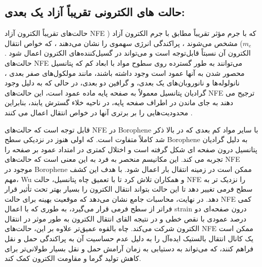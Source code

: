 \subsection{حالت های الکترونی تقریباً آزاد یک بعدی:}
حالت‌های تقریباً الکترون آزاد \gls{NFE} که با جرم مؤثر تقریباً مطابق با جرم الکترون آزاد ($m_e$) مشخص می‌شوند \cite{eknapakulNearlyfreeelectronSystemMonolayer2016, fengElectronicPropertiesSuperatom2011}، پراکندگی انرژی سهموی را نشان می‌دهند ، که خواص انتقال الکترون آن نسبتاً قابل‌توجه است و می‌تواند در گسیل‌کننده‌های الکترون اعمال شود \cite{chenNonlocalChemicalReactivity2009, csanyiRoleInterlayerState2005}. حالت‌های \gls{NFE} می‌توانند به طور گسترده روی سطوح مواد با ابعاد کم که پتانسیل محصور شدن به آنها عمود است وجود داشته باشند، مانند مولکول‌های صفر بعدی ، \cite{zhaoSuperatomStatesFullerenes2009, fengAtomlikeHollowcoreboundMolecular2008} نانولوله‌ها و نانوروبان‌های یک بعدی، \cite{yamanakaElectronInjectionNearly2014, huNearlyFreeElectron2010} و گرافین دو بعدی، \cite{silkinImagePotentialStates2009} در حالی که به دلیل وجود گرادیان پتانسیل معمولاً به صفحه پایه ماده عمود است، این حالت‌های \gls{NFE} ترجیح می دهند به جای ماندن در اطراف صفحه پایه، در ناحیه خلاء گسترش یابند، بنابراین محدودیت‌هایی را بر برتری آنها در خواص انتقال اعمال می کنند \cite{kongOnedimensionalNearlyFree2019}.

قابل توجه است که حالت‌های \gls{NFE} در \gls{Borophene} با سایر مواد کم بعدی که در بالا ذکر شد کاملاً متفاوت است. که اولی هنوز در نزدیکی سطح \gls{Borophene} به دلیل گرادیان پتانسیل درون صفحه ای شکل گرفته است و اختلال کمتری در امتداد عمود بر صفحه را تجربه می کند. این مکانیسم منحصر به فرد به این معنی است که حالت‌های \gls{NFE} موجود در \gls{Borophene} ممکن است در زمینه انتقال بار اعمال شود. با هدف این کشف مهم، \gls{Wu} و همکاران تلاش کرد تا با تعمیق چاه پتانسیل، حالت \gls{NFE} را نزدیک تر به سطح فرمی تغییر دهد تا این حالت بتواند انتقال الکترون را بسیار بهتر تحت تأثیر قرار دهد. در نهایت، محاسبات جامع نشان می‌دهد که موقعیت بهینه برای حالت \gls{NFE} کمی فراتر از سطح فرمی قرار می‌گیرد، به طوری که با اعمال \gls{strain} درون صفحه‌ای دو درصد عمودی با نقص خطی و در نتیجه القای انتقال الکترون به طور موثر در انتقال الکترون شرکت می‌کند. چاه بالقوه عمیق‌تر علاوه بر این، حالت‌های \gls{NFE} ممکن است یک کانال انتقال بالستیک ایده‌آل را به دلیل عدم حساسیت آن به پراکندگی حمل و نقل فراهم کنند، که می‌تواند به دستیابی به زمان آرامش حمل و نقل بسیار طولانی‌تر برای کاهش تولید گرما و مقاومت الکترون کمک کند.
